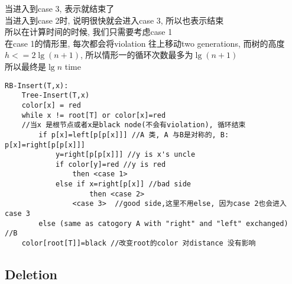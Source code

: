 \documentclass{article}
\begin{document}
当进入到case 3, 表示就结束了\\
当进入到case 2时, 说明很快就会进入case 3, 所以也表示结束\\
所以在计算时间的时候, 我们只需要考虑case 1\\
在case 1的情形里, 每次都会将violation 往上移动two generations, 而树的高度$h<=2\lg(n+1)$, 所以情形一的循环次数最多为$\lg(n+1)$\\
所以最终是$\lg n$ time
\begin{verbatim}
RB-Insert(T,x):
    Tree-Insert(T,x)
    color[x] = red
    while x != root[T] or color[x]=red
    //当x 是根节点或者x是black node(不会有violation), 循环结束
        if p[x]=left[p[p[x]]] //A 类, A 与B是对称的, B: p[x]=right[p[p[x]]]
            y=right[p[p[x]]] //y is x's uncle
            if color[y]=red //y is red
                then <case 1>
            else if x=right[p[x]] //bad side
                    then <case 2>
                <case 3>  //good side,这里不用else, 因为case 2也会进入case 3
        else (same as catogory A with "right" and "left" exchanged) //B
    color[root[T]]=black //改变root的color 对distance 没有影响
\end{verbatim}

\subsection{Deletion}
\end{document}

